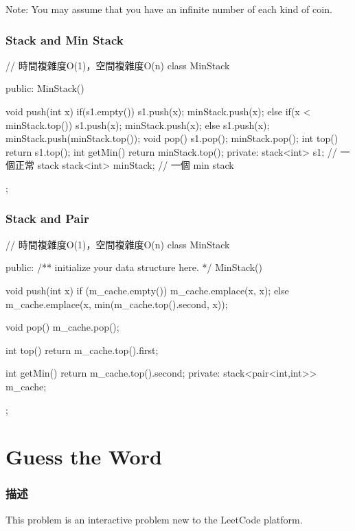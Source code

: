 Note:
You may assume that you have an infinite number of each kind of coin.

\subsubsection{Stack and Min Stack}
\begin{Code}
// 時間複雜度O(1)，空間複雜度O(n)
class MinStack {
public:
    MinStack(){

    }
    void push(int x)
    {
        if(s1.empty())
        {
            s1.push(x);
            minStack.push(x);
        }
        else
        {
            if(x < minStack.top())
            {
                s1.push(x);
                minStack.push(x);
            }
            else
            {
                s1.push(x);
                minStack.push(minStack.top());
            }
        }
    }
    void pop()
    {
        s1.pop();
        minStack.pop();
    }
    int top()
    {
        return s1.top();
    }
    int getMin()
    {
        return minStack.top();
    }
private:
    stack<int> s1; // 一個正常 stack
    stack<int> minStack; // 一個 min stack
};
\end{Code}

\subsubsection{Stack and Pair}
\begin{Code}
// 時間複雜度O(1)，空間複雜度O(n)
class MinStack {
public:
    /** initialize your data structure here. */
    MinStack() {

    }

    void push(int x) {
        if (m_cache.empty())
            m_cache.emplace(x, x);
        else
            m_cache.emplace(x, min(m_cache.top().second, x));
    }

    void pop() {
        m_cache.pop();
    }

    int top() {
        return m_cache.top().first;
    }

    int getMin() {
        return m_cache.top().second;
    }
private:
    stack<pair<int,int>> m_cache;
};
\end{Code}

\section{Guess the Word} %
\label{sec:guess-the-word}

\subsubsection{描述}
This problem is an interactive problem new to the LeetCode platform.

